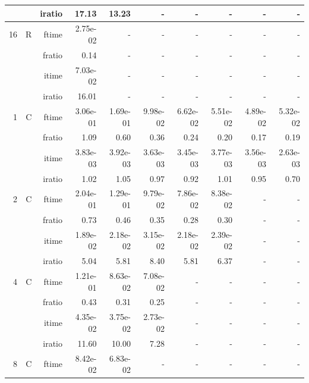 \documentclass[a4paper]{article}
\begin{document}
\begin{table}[htbp]
\begin{center}
\begin{small}
\begin{tabular}{|r|r|r|r|r|r|r|r|r|r|}
          &      & iratio & 17.13 & 13.23 &     -     &     -     &     -     &     -     &     -     \\ \hline 
     16 & R & ftime & 2.75e-02 &     -     &     -     &     -     &     -     &     -     &     -     \\   
          &      & fratio & 0.14 &     -     &     -     &     -     &     -     &     -     &     -     \\   
          &      & itime & 7.03e-02 &     -     &     -     &     -     &     -     &     -     &     -     \\   
          &      & iratio & 16.01 &     -     &     -     &     -     &     -     &     -     &     -     \\ \hline  \hline
    1 & C & ftime & 3.06e-01 & 1.69e-01 & 9.98e-02 & 6.62e-02 & 5.51e-02 & 4.89e-02 & 5.32e-02 \\   
          &      & fratio & 1.09 & 0.60 & 0.36 & 0.24 & 0.20 & 0.17 & 0.19 \\   
          &      & itime & 3.83e-03 & 3.92e-03 & 3.63e-03 & 3.45e-03 & 3.77e-03 & 3.56e-03 & 2.63e-03 \\   
          &      & iratio & 1.02 & 1.05 & 0.97 & 0.92 & 1.01 & 0.95 & 0.70 \\ \hline 
     2 & C & ftime & 2.04e-01 & 1.29e-01 & 9.79e-02 & 7.86e-02 & 8.38e-02 &     -     &     -     \\   
          &      & fratio & 0.73 & 0.46 & 0.35 & 0.28 & 0.30 &     -     &     -     \\   
          &      & itime & 1.89e-02 & 2.18e-02 & 3.15e-02 & 2.18e-02 & 2.39e-02 &     -     &     -     \\   
          &      & iratio & 5.04 & 5.81 & 8.40 & 5.81 & 6.37 &     -     &     -     \\ \hline 
     4 & C & ftime & 1.21e-01 & 8.63e-02 & 7.08e-02 &     -     &     -     &     -     &     -     \\   
          &      & fratio & 0.43 & 0.31 & 0.25 &     -     &     -     &     -     &     -     \\   
          &      & itime & 4.35e-02 & 3.75e-02 & 2.73e-02 &     -     &     -     &     -     &     -     \\   
          &      & iratio & 11.60 & 10.00 & 7.28 &     -     &     -     &     -     &     -     \\ \hline 
     8 & C & ftime & 8.42e-02 & 6.83e-02 &     -     &     -     &     -     &     -     &     -     \\   

\end{tabular}
\end{small}
\end{center}
\end{table}
\end{document}
